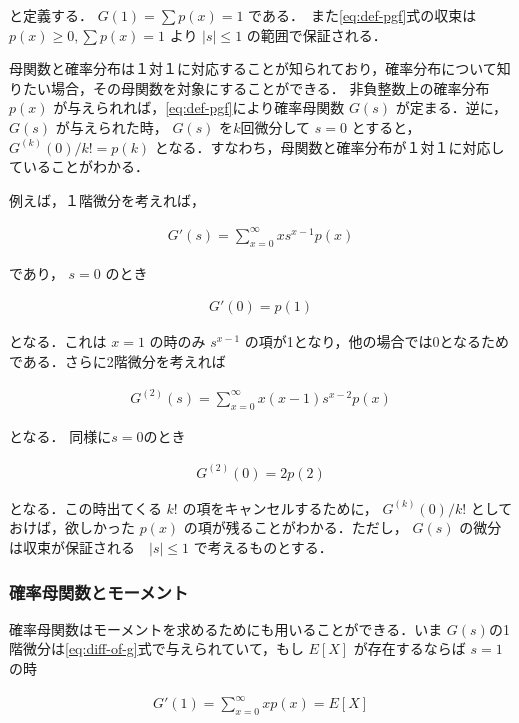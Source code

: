 \documentclass[12pt,a4j,draft]{jarticle}
\numberwithin{equation}{section}
\theoremstyle{break}
\begin{document}
と定義する． $G(1) = \sum p(x) = 1$ である．　また\eqref{eq:def-pgf}式の収束は $p(x) \geq 0, \sum p(x) = 1$ より $|s| \leq 1$ の範囲で保証される．  

母関数と確率分布は１対１に対応することが知られており，確率分布について知りたい場合，その母関数を対象にすることができる．
非負整数上の確率分布 $p(x)$ が与えられれば，\eqref{eq:def-pgf}により確率母関数 $G(s)$ が定まる．逆に， $G(s)$ が与えられた時， $G(s)$ を$k$回微分して $s=0$ とすると， $G^{(k)}(0)/k! = p(k)$ となる．すなわち，母関数と確率分布が１対１に対応していることがわかる．

例えば，１階微分を考えれば，

\begin{align}
    \label{eq:diff-of-g}
    G'(s) = \sum_{x=0}^{\infty} x s^{x-1} p(x)
\end{align}

であり， $s=0$ のとき

\begin{align*}
    G'(0) = p(1)
\end{align*}

となる．これは $x=1$ の時のみ $s^{x-1}$ の項が1となり，他の場合では0となるためである．さらに2階微分を考えれば

\begin{align*}
    G^{(2)}(s) = \sum_{x=0}^{\infty} x(x-1) s^{x-2} p(x)
\end{align*}

となる． 同様に$s=0$のとき

\begin{align*}
    G^{(2)}(0) = 2 p(2)
\end{align*}

となる．この時出てくる $k!$ の項をキャンセルするために， $G^{(k)}(0) / k!$ としておけば，欲しかった $p(x)$ の項が残ることがわかる．ただし， $G(s)$ の微分は収束が保証される　$|s| \leq 1$ で考えるものとする．

\subsubsection{確率母関数とモーメント}  

確率母関数はモーメントを求めるためにも用いることができる．いま $G(s)$の1階微分は\eqref{eq:diff-of-g}式で与えられていて，もし $E[X]$ が存在するならば $s=1$ の時

\begin{align}
    G'(1) = \sum_{x=0}^\infty x p(x) = E[X]
\end{align}
\end{document}
